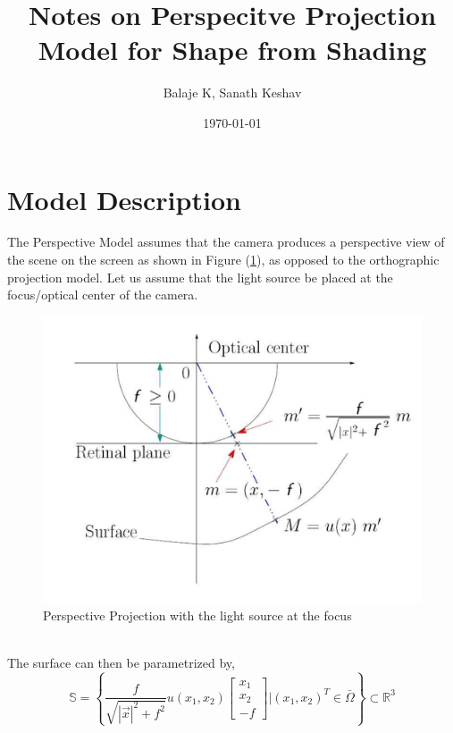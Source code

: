 \documentclass[11pt]{report}
\begin{document}
	\title{\textbf{Notes on Perspecitve Projection Model for Shape from Shading}}
	\author{Balaje K, Sanath Keshav}
	\date{\today}
	\maketitle
	
	\pagebreak
	
	\section{Model Description}
	The Perspective Model assumes that the camera produces a perspective view of the scene on the screen as shown in Figure (\ref{fig:1}), as opposed to the orthographic projection model. Let us assume that the light source be placed at the focus/optical center of the camera.
	\begin{figure}[h!]
		\centering
		\includegraphics[scale=0.5]{focus.png}
		\caption{Perspective Projection with the light source at the focus}
		\label{fig:1}
	\end{figure}
	\noindent
	\\
	The surface can then be parametrized by,
	\begin{equation}
		\mathbb{S} = \left\{ \frac{f}{\sqrt{|\vec{x}|^2+f^2}}u(x_1,x_2)
		\begin{bmatrix}
		x_1\\
		x_2\\
		-f
		\end{bmatrix}
		\Bigg | (x_1,x_2)^T \in \bar{\Omega}
		\right\} \subset \mathbb{R}^3
	\end{equation}
\end{document}
